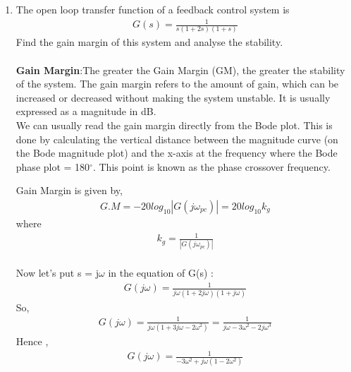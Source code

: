 \begin{enumerate}[label=\thesection.\arabic*.,ref=\thesection.\theenumi]
\item
 
The open loop transfer function of a feedback control system is  
\begin{align}
G(s) = \frac{1}{s(1+2s)(1+s)} 
\end{align}
Find the gain margin of this system and analyse the stability.
 \\


\solution
\\
\textbf{Gain Margin}:The greater the Gain Margin (GM), the greater the stability of the system. The gain margin refers to the amount of gain, which can be increased or decreased without making the system unstable. It is usually expressed as a magnitude in dB.
\\

We can usually read the gain margin directly from the Bode plot. This is done by calculating the vertical distance between the magnitude curve (on the Bode magnitude plot) and the x-axis at the frequency where the Bode phase plot = 180$^{\circ}$. This point is known as the phase crossover frequency.

Gain Margin is given by,
\begin{align}
G.M = -20log_{10}|G(j\omega_{pc})| = 20log_{10}k_{g}
\end{align}
where 
\begin{align}
k_{g}=\frac{1}{|G(j\omega_{pc})|} 
\end{align}
\\

Now let's put s = j$\omega$ in the equation of G(s) :
\begin{align}
G(j\omega) = \frac{1}{j\omega(1+2j\omega)(1+j\omega)} 
\end{align}
So,
\begin{align}
G(j\omega) = \frac{1}{j\omega(1+3j\omega-2\omega^2)}=\frac{1}{j\omega-3\omega^2-2j\omega^3}
\end{align}
Hence ,
\begin{align}
G(j\omega) = \frac{1}{-3\omega^2+j\omega(1-2\omega^2)} 
\end{align}


\end{enumerate}
